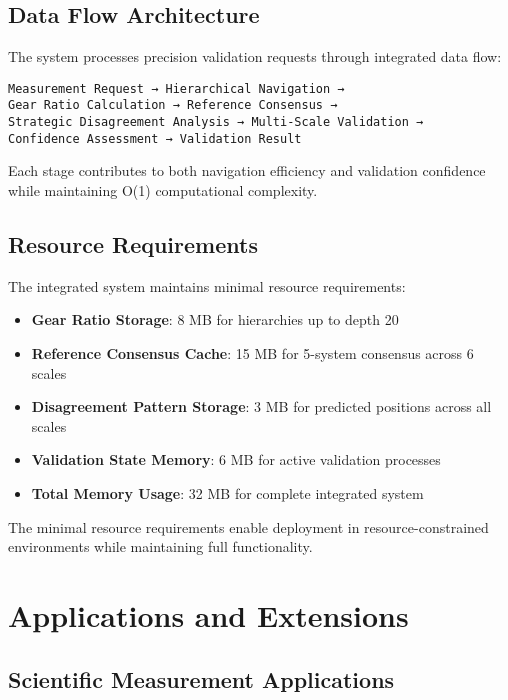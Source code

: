 \documentclass[12pt,a4paper]{article}
\begin{document}
\subsection{Data Flow Architecture}

The system processes precision validation requests through integrated data flow:

\begin{verbatim}
Measurement Request → Hierarchical Navigation →
Gear Ratio Calculation → Reference Consensus →
Strategic Disagreement Analysis → Multi-Scale Validation →
Confidence Assessment → Validation Result
\end{verbatim}

Each stage contributes to both navigation efficiency and validation confidence while maintaining O(1) computational complexity.

\subsection{Resource Requirements}

The integrated system maintains minimal resource requirements:

\begin{itemize}
\item \textbf{Gear Ratio Storage}: 8 MB for hierarchies up to depth 20
\item \textbf{Reference Consensus Cache}: 15 MB for 5-system consensus across 6 scales
\item \textbf{Disagreement Pattern Storage}: 3 MB for predicted positions across all scales
\item \textbf{Validation State Memory}: 6 MB for active validation processes
\item \textbf{Total Memory Usage}: 32 MB for complete integrated system
\end{itemize}

The minimal resource requirements enable deployment in resource-constrained environments while maintaining full functionality.

\section{Applications and Extensions}

\subsection{Scientific Measurement Applications}
\end{document}
